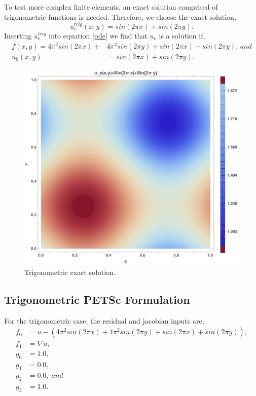 To test more complex finite elements, an exact solution comprised of trigonometric functions is needed.  Therefore, we choose the exact solution,
\begin{equation}
u_e^{trig}(x,y) = sin( 2 \pi x) + sin( 2 \pi y).
\end{equation}
Inserting $u_e^{trig}$ into equation \eqref{pde} we find that $u_e$ is a solution if,
\begin{align}
f(x,y) = 4 \pi^2 sin(2 \pi x) +& 4 \pi^2 sin(2 \pi y) + sin( 2 \pi x) + sin( 2 \pi y), \, and \\
u_0(x,y) &= sin( 2 \pi x) + sin( 2 \pi y).
\end{align}
\begin{figure}[!ht]
\begin{center}
\includegraphics[scale=0.4]{figures/Trig_Exact_Mathematica.png}
\end{center}
\caption{Trigonometric exact solution.}
\label{TrigExact}
\end{figure}

\subsection{Trigonometric PETSc Formulation}

For the trigonometric case, the residual and jacobian inputs are,
\begin{align}
f_0 &= u - (4 \pi^2 sin(2 \pi x) + 4 \pi^2 sin(2 \pi y) + sin( 2 \pi x) + sin( 2 \pi y)), \\
f_1 &= \nabla u, \\
g_0 &= 1.0, \\
g_1 &= 0.0, \\
g_2 &= 0.0,\; and \\
g_3 &= 1.0.
\end{align}
